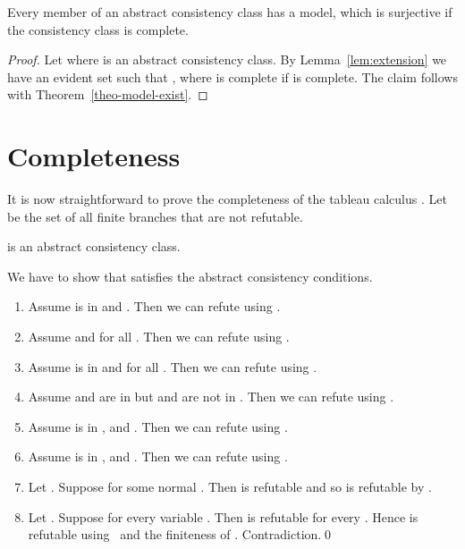 \begin{thm}
  \label{theo-acc-model-existence}
  Every member of an abstract consistency class has a
  model, which is surjective if the consistency class
  is complete.
\end{thm}

\begin{proof}
  Let  where  is an abstract
  consistency class.  By Lemma~\ref{lem:extension} we
  have an evident set  such that , where
   is complete if  is complete.  The claim
  follows with Theorem~\ref{theo-model-exist}.
\end{proof}


\section{Completeness}
\label{sec:completeness}

It is now straightforward to prove the completeness of
the tableau calculus . 
Let~\emph{} be the
set of all finite branches that are not refutable.



\begin{lem}
  \label{lem:acc-completeness}
   is an abstract consistency class.
\end{lem}

\proof
    We have to show that  satisfies the
    abstract consistency conditions.
\begin{enumerate}[\AMat]
\item[{\ADN}] Assume  is in  and
  .  Then we can refute 
  using .
\item[{\AMat}] Assume  and  for all .
  Then we can refute  using \TRMat.
\item[{\ADec}] Assume  is in  and 
  for all .
  Then we can refute  using \TRDec.
\item[{\ACon}] Assume  and
   are in  but  and  are not in
  .  Then we can refute  using \TRCon.
\item[{\ABQ}] Assume  is in ,
   and .
  Then we can refute  using
  \TRBQ.
\item[{\ABE}] Assume  is in ,
   and .  Then we can refute  using
  \TRBE.
\item[{\AFQ}] Let .
  Suppose 
  for some normal .  Then
   is refutable and so
   is refutable by .
\item[{\AFE}] Let .  Suppose
   for
  every variable .  Then
   is refutable for
  every .  Hence  is refutable using~\TRFE
  and the finiteness of .  Contradiction.\qed
\end{enumerate}

